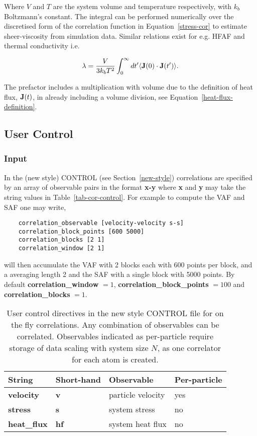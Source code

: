 Where $V$ and $T$ are the system volume and temperature respectively, with $k_{b}$ Boltzmann's constant. The integral can be performed numerically
over the discretised form of the correlation function in Equation~\ref{stress-cor} to estimate sheer-viscosity from simulation data. Similar relations exist for e.g. HFAF and thermal conductivity i.e.

\begin{equation}
    \lambda = \frac{V}{3k_{b}T^2}\int_{0}^{\infty} dt' \langle {\bf J}(0)\cdot {\bf J}(t') \rangle. \label{thermal-conductivity-gk}
\end{equation}

The prefactor includes a multiplication with volume due to the definition of heat flux, ${\bf J}(t)$, in \D already including a volume division, see Equation~\ref{heat-flux-definition}.

\subsection{User Control}\label{cor-user}

\subsubsection{Input}

In the (new style) CONTROL (see Section~\ref{new-style}) correlations are specified by an array of observable pairs in the format {\bf x-y} where {\bf x} and {\bf y} may take the string values in Table~\ref{tab-cor-control}. For example to compute the VAF and SAF one may write,

\begin{verbatim}
    correlation_observable [velocity-velocity s-s]
    correlation_block_points [600 5000]
    correlation_blocks [2 1]
    correlation_window [2 1]
\end{verbatim}

\D will then accumulate the VAF with 2 blocks each with 600 points per block, and a averaging length 2 and the SAF with a single block with
5000 points. By default {\bf correlation\_window} $=1$, {\bf correlation\_block\_points} $=100$ and {\bf correlation\_blocks} $=1$.

\begin{table}[]
    \centering
    \begin{tabular}{llll}
        \hline\hline
        String & Short-hand & Observable & Per-particle \\
        \hline
        {\bf velocity} & {\bf v} & particle velocity & yes \\
        \hline
        {\bf stress}   & {\bf s} & system stress & no \\
        \hline
        {\bf heat\_flux} & {\bf hf} & system heat flux & no \\
        \hline\hline
    \end{tabular}
    \caption{User control directives in the new style CONTROL file for on the fly correlations. Any combination of observables can 
    be correlated. Observables indicated as per-particle require storage of data scaling with system size $N$, as one correlator for each atom is created.}
\end{table}\label{tab-cor-control}

